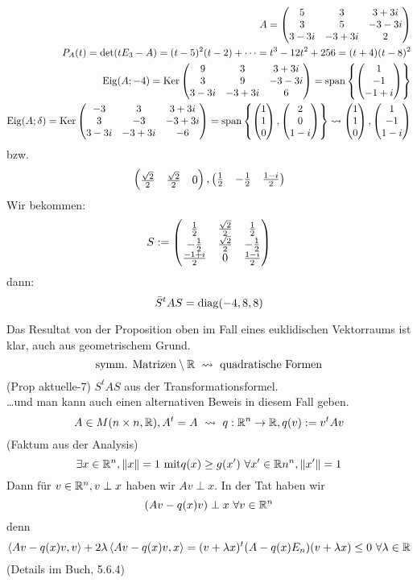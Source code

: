 \begin{Bsp}
  \begin{align*}
    A=\begin{pmatrix}5&3&3+3i\\3&5&-3-3i\\3-3i&-3+3i&2\end{pmatrix}\\
    P_A(t)=\det(tE_3-A)=(t-5)^2(t-2)+\cdots = t^3-12t^2+256=(t+4)(t-8)^2\\
    \operatorname{Eig}(A;-4)=\operatorname{Ker}\begin{pmatrix}9&3&3+3i\\3&9&-3-3i\\3-3i&-3+3i&6\end{pmatrix}=\operatorname{span} \left\{ \begin{pmatrix}1\\-1\\-1+i\end{pmatrix} \right\} \\
    \operatorname{Eig}(A;\delta)=\operatorname{Ker}\begin{pmatrix}-3&3&3+3i\\3&-3&-3+3i\\3-3i&-3+3i&-6\end{pmatrix}=\operatorname{span}\left\{ \begin{pmatrix}1\\1\\0\end{pmatrix} ,\begin{pmatrix}2\\0\\1-i\end{pmatrix} \right\} \rightsquigarrow \begin{pmatrix}1\\1\\0\end{pmatrix},\begin{pmatrix}1\\-1\\1-i\end{pmatrix}
  \end{align*}
  bzw.
  \[\begin{pmatrix}\frac{\sqrt{2}}{2}&\frac{\sqrt{2}}{2}&0\end{pmatrix},\begin{pmatrix}\frac{1}{2}&-\frac{1}{2}&\frac{1-i}{2}\end{pmatrix}\]
  Wir bekommen:
  \[S:=\begin{pmatrix}\frac{1}{2}&\frac{\sqrt{2}}{2}&\frac{1}{2}\\ -\frac{1}{2}&\frac{\sqrt{2}}{2}&-\frac{1}{2}\\ \frac{-1+i}{2}&0&\frac{1-i}{2}\end{pmatrix}\]
  dann:
  \[\bar S^tAS=\operatorname{diag}(-4,8,8)\]
\end{Bsp}
\begin{Bem}
  Das Resultat von der Proposition oben im Fall eines euklidischen Vektorraums ist klar, auch aus geometrischem Grund.
  \[\text{symm. Matrizen}\setminus \mb{R}\ \rsa\ \text{quadratische Formen}\]
  (Prop aktuelle-7) $S^tAS$ aus der Transformationsformel.\\
  \ldots und man kann auch einen alternativen Beweis in diesem Fall geben.
  \[A\in M(n\times n,\mb{R}), A^t=A\ \rsa\ q:\mb{R}^n\to\mb{R},q(v):=v^tAv\]
  (Faktum aus der Analysis)
  \[\exists x\in\mathbb{R}^n, \left\| x \right\|=1\ \text{mit} q(x)\geq g(x')\ \forall x'\in\mathbb{R}n^n, \left\| x' \right\|=1\]
  Dann für $v\in\mathbb{R}^n, v\perp x$ haben wir $Av\perp x$. In der Tat haben wir 
  \[(Av-q(x)v)\perp x\ \forall v\in\mb{R}^n\]
  denn
  \[\left\langle Av-q(x)v, v\right\rangle +2\lambda\left\langle Av-q(x)v,x \right\rangle =(v+\lambda x)^t(A-q(x)E_n)(v+\lambda x)\leq 0\ \forall \lambda\in\mathbb{R}\]
  (Details im Buch, 5.6.4)
\end{Bem}
